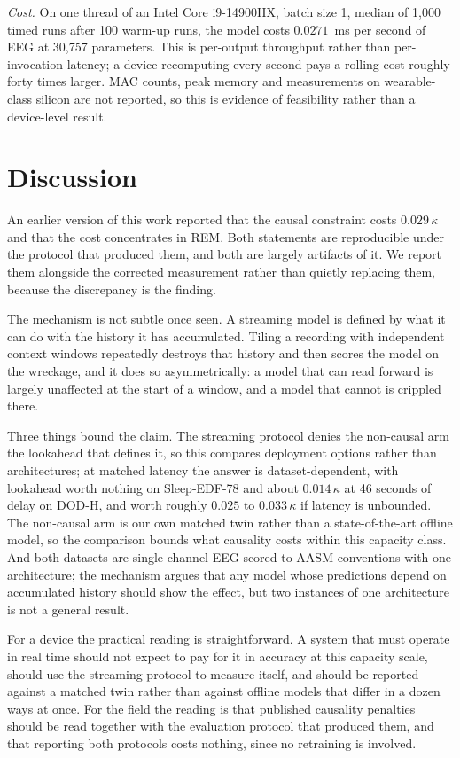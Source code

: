 \documentclass[conference]{IEEEtran}
\begin{document}
\emph{Cost.} On one thread of an Intel Core i9-14900HX, batch size 1, median of 1{,}000 timed runs
after 100 warm-up runs, the model costs $0.0271$~ms per second of EEG at 30{,}757 parameters. This
is per-output throughput rather than per-invocation latency; a device recomputing every second pays
a rolling cost roughly forty times larger. MAC counts, peak memory and measurements on
wearable-class silicon are not reported, so this is evidence of feasibility rather than a
device-level result.

\section{Discussion}

An earlier version of this work reported that the causal constraint costs $0.029\,\kappa$ and that
the cost concentrates in REM. Both statements are reproducible under the protocol that produced
them, and both are largely artifacts of it. We report them alongside the corrected measurement
rather than quietly replacing them, because the discrepancy is the finding.

The mechanism is not subtle once seen. A streaming model is defined by what it can do with the
history it has accumulated. Tiling a recording with independent context windows repeatedly destroys
that history and then scores the model on the wreckage, and it does so asymmetrically: a model that
can read forward is largely unaffected at the start of a window, and a model that cannot is
crippled there.

Three things bound the claim. The streaming protocol denies the non-causal arm the lookahead that
defines it, so this compares deployment options rather than architectures; at matched latency the
answer is dataset-dependent, with lookahead worth nothing on Sleep-EDF-78 and about $0.014\,\kappa$
at 46 seconds of delay on DOD-H, and worth roughly $0.025$ to $0.033\,\kappa$ if latency is
unbounded. The non-causal arm is our own matched twin rather than a state-of-the-art offline model,
so the comparison bounds what causality costs within this capacity class. And both datasets are
single-channel EEG scored to AASM conventions with one architecture; the mechanism argues that any
model whose predictions depend on accumulated history should show the effect, but two instances of
one architecture is not a general result.

For a device the practical reading is straightforward. A system that must operate in real time
should not expect to pay for it in accuracy at this capacity scale, should use the streaming
protocol to measure itself, and should be reported against a matched twin rather than against
offline models that differ in a dozen ways at once. For the field the reading is that published
causality penalties should be read together with the evaluation protocol that produced them, and
that reporting both protocols costs nothing, since no retraining is involved.
\end{document}
